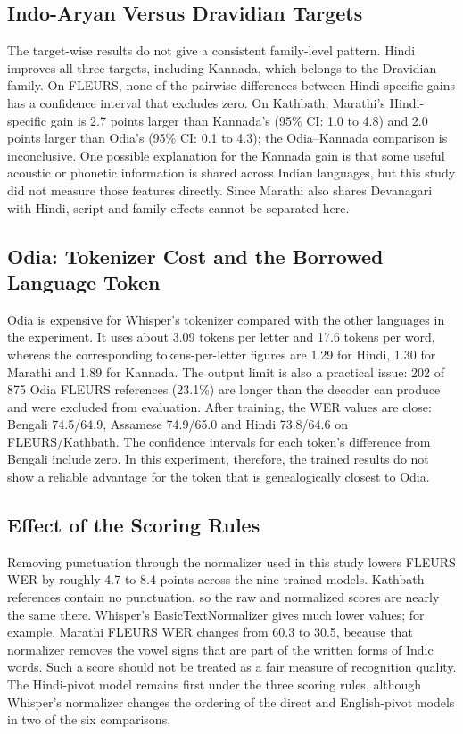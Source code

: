 \documentclass[conference]{IEEEtran}
\begin{document}


\subsection{Indo-Aryan Versus Dravidian Targets}

The target-wise results do not give a consistent family-level pattern.
Hindi improves all three targets, including Kannada, which belongs to
the Dravidian family. On FLEURS, none of the pairwise differences
between Hindi-specific gains has a confidence interval that excludes
zero. On Kathbath, Marathi's Hindi-specific gain is 2.7 points larger
than Kannada's (95\% CI: 1.0 to 4.8) and 2.0 points larger than Odia's
(95\% CI: 0.1 to 4.3); the Odia--Kannada comparison is inconclusive.
One possible explanation for the Kannada gain is that some useful
acoustic or phonetic information is shared across Indian languages,
but this study did not measure those features directly. Since Marathi
also shares Devanagari with Hindi, script and family effects cannot be
separated here.

\subsection{Odia: Tokenizer Cost and the Borrowed Language Token}

Odia is expensive for Whisper's tokenizer compared with the other
languages in the experiment. It uses about 3.09 tokens per letter and
17.6 tokens per word, whereas the corresponding tokens-per-letter
figures are 1.29 for Hindi, 1.30 for Marathi and 1.89 for Kannada. The
output limit is also a practical issue: 202 of 875 Odia FLEURS references
(23.1\%) are longer than the decoder can produce and were excluded from
evaluation. After training, the WER values are close: Bengali
74.5/64.9, Assamese 74.9/65.0 and Hindi 73.8/64.6 on FLEURS/Kathbath.
The confidence intervals for each token's difference from Bengali
include zero. In this experiment, therefore, the trained results do not
show a reliable advantage for the token that is genealogically closest
to Odia.



\subsection{Effect of the Scoring Rules}

Removing
punctuation through the normalizer used in this study lowers FLEURS WER
by roughly 4.7 to 8.4 points across the nine trained models. Kathbath
references contain no punctuation, so the raw and normalized scores are
nearly the same there. Whisper's BasicTextNormalizer gives much lower
values; for example, Marathi FLEURS WER changes from 60.3 to 30.5,
because that normalizer removes the vowel signs that are part of the
written forms of Indic words. Such a score should not be treated as a
fair measure of recognition quality. The Hindi-pivot model remains first
under the three scoring rules, although Whisper's normalizer changes the
ordering of the direct and English-pivot models in two of the six
comparisons.
\end{document}
